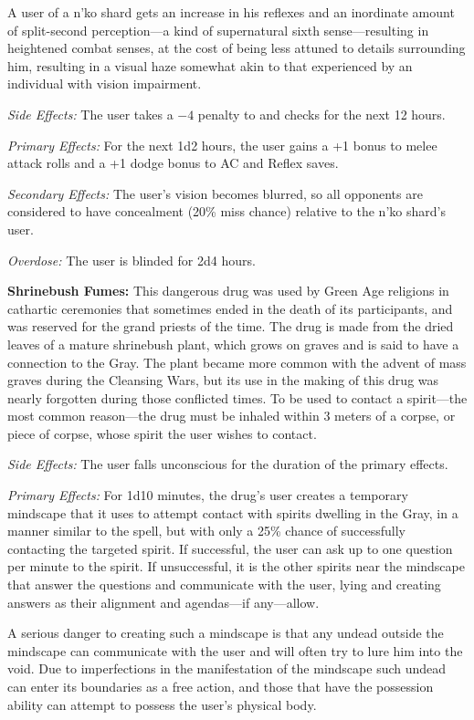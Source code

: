 A user of a n'ko shard gets an increase in his reflexes and an inordinate amount of split-second perception---a kind of supernatural sixth sense---resulting in heightened combat senses, at the cost of being less attuned to details surrounding him, resulting in a visual haze somewhat akin to that experienced by an individual with vision impairment.

\textit{Side Effects:} The user takes a $-4$ penalty to  and  checks for the next 12 hours.

\textit{Primary Effects:} For the next 1d2 hours, the user gains a +1 bonus to melee attack rolls and a +1 dodge bonus to AC and Reflex saves.

\textit{Secondary Effects:} The user's vision becomes blurred, so all opponents are considered to have concealment (20\% miss chance) relative to the n'ko shard's user.

\textit{Overdose:} The user is blinded for 2d4 hours.

\textbf{Shrinebush Fumes:} This dangerous drug was used by Green Age religions in cathartic ceremonies that sometimes ended in the death of its participants, and was reserved for the grand priests of the time. The drug is made from the dried leaves of a mature shrinebush plant, which grows on graves and is said to have a connection to the Gray. The plant became more common with the advent of mass graves during the Cleansing Wars, but its use in the making of this drug was nearly forgotten during those conflicted times. To be used to contact a spirit---the most common reason---the drug must be inhaled within 3 meters of a corpse, or piece of corpse, whose spirit the user wishes to contact.

\textit{Side Effects:} The user falls unconscious for the duration of the primary effects.

\textit{Primary Effects:} For 1d10 minutes, the drug's user creates a temporary mindscape that it uses to attempt contact with spirits dwelling in the Gray, in a manner similar to the  spell, but with only a 25\% chance of successfully contacting the targeted spirit. If successful, the user can ask up to one question per minute to the spirit. If unsuccessful, it is the other spirits near the mindscape that answer the questions and communicate with the user, lying and creating answers as their alignment and agendas---if any---allow.

A serious danger to creating such a mindscape is that any undead outside the mindscape can communicate with the user and will often try to lure him into the void. Due to imperfections in the manifestation of the mindscape such undead can enter its boundaries as a free action, and those that have the possession ability can attempt to possess the user's physical body.

